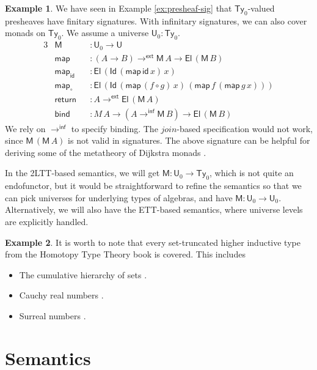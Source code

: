 \documentclass[12pt,a4paper,twoside,openany]{book}
\theoremstyle{remark}
\theoremstyle{definition}
\newtheorem{myexample}{Example}
\theoremstyle{theorem}
\newcommand{\mi}[1]{\mathit{#1}}
\newcommand{\ms}[1]{\mathsf{#1}}
\newcommand{\id}{\mathsf{id}}
\newcommand{\Ty}{\mathsf{Ty}}
\newcommand{\U}{\mathsf{U}}
\newcommand{\El}{\mathsf{El}}
\newcommand{\Id}{\mathsf{Id}}
\newcommand{\toe}{\to^{\ms{ext}}}
\newcommand{\toinf}{\to^{\ms{inf}}}
\begin{document}
\begin{myexample}
We have seen in Example \ref{ex:presheaf-sig} that $\Ty_0$-valued presheaves have finitary signatures.
With infinitary signatures, we can also cover monads on $\Ty_0$. We assume a
universe $\U_0 : \Ty_0$.
\begin{alignat*}{3}
  &\ms{M}              &&: \U_0 \to \U\\
  &\ms{map}       &&: (A \to B) \toe \ms{M}\,A \to \El\,(\ms{M}\,B)\\
  &\ms{map_{id}}   &&: \El\,(\Id\,(\ms{map}\,\id\,x)\,x)\\
  &\ms{map_{\circ}} &&: \El\,(\Id\,(\ms{map}\,(f \circ g)\,x)\,(\ms{map}\,f\,(\ms{map}\,g\,x)))\\
  &\ms{return}    &&: A \toe \El\,(\ms{M}\,A)\\
  &\ms{bind}      &&: M\,A \to (A \toinf \ms{M}\,B) \to \El\,(\ms{M}\,B)
\end{alignat*}
We rely on $\toinf$ to specify binding. The $\mi{join}$-based specification
would not work, since $\ms{M}\,(\ms{M}\,A)$ is not valid in signatures. The above
signature can be helpful for deriving some of the metatheory of Dijkstra monads
\cite[Section~5]{dijkstramonad}.

In the 2LTT-based semantics, we will get $\ms{M} : \U_0 \to \Ty_0$, which is not
quite an endofunctor, but it would be straightforward to refine the semantics so
that we can pick universes for underlying types of algebras, and have $\ms{M} : \U_0
\to \U_0$. Alternatively, we will also have the ETT-based semantics, where
universe levels are explicitly handled.
\end{myexample}

\begin{myexample}
It is worth to note that every set-truncated higher inductive type from the
Homotopy Type Theory book \cite{hottbook} is covered. This includes
\begin{itemize}
\item The cumulative hierarchy of sets \cite[Section~10.5]{hottbook}.
\item Cauchy real numbers \cite[Section~11.3]{hottbook}.
\item Surreal numbers \cite[Section~11.6]{hottbook}.
\end{itemize}
\end{myexample}

\section{Semantics}
\end{document}
